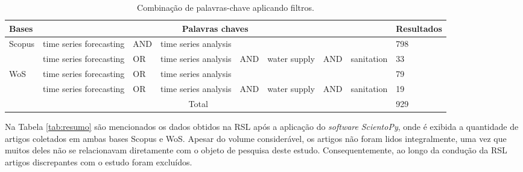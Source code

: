 \begin{table}[!htb]
	\centering
	\caption{Combinação de palavras-chave aplicando filtros.}\label{tb1}
	\begin{tabular}{@{}lp{2cm}lp{2cm}lp{1.5cm}lp{2cm}l@{}}
		\toprule
		Bases                  & \multicolumn{7}{c}{Palavras chaves}                              & Resultados \\ \midrule
		\multirow{2}{*}{Scopus} & time series forecasting & AND & time series analysis &     &              &     &            & 798        \\
		& time series forecasting & OR  & time series analysis & AND & water supply & AND & sanitation & 33         \\ \hline
		\multirow{2}{*}{WoS}    & time series forecasting & OR  & time series analysis &     &              &     &            & 79         \\
		& time series forecasting & OR  & time series analysis & AND & water supply & AND & sanitation & 19         \\ \hline
		\multicolumn{8}{c}{Total}                                                                                              & 929        \\ \bottomrule
	\end{tabular}	
\end{table}

Na Tabela \ref{tab:resumo} são mencionados os dados obtidos na RSL após a aplicação do \textit{software} \textit{ScientoPy}, onde é exibida a quantidade de artigos coletados em ambas bases Scopus e WoS. Apesar do volume considerável, os artigos não foram lidos integralmente, uma vez que muitos deles não se relacionavam diretamente com o objeto de pesquisa deste estudo. Consequentemente, ao longo da condução da RSL artigos discrepantes com o estudo foram excluídos.

